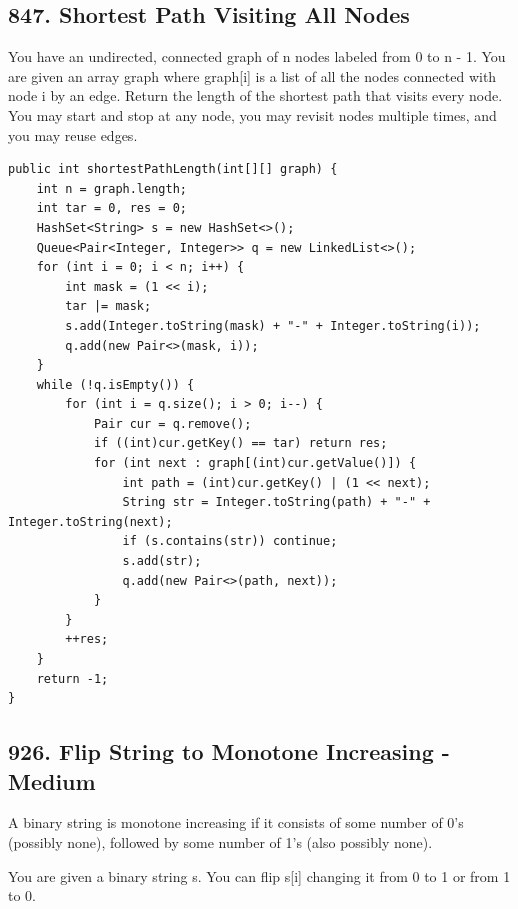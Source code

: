 \documentclass[9pt, b5paaper]{book}
\begin{document}
\subsection{847. Shortest Path Visiting All Nodes}
\label{sec-1-4-22}
You have an undirected, connected graph of n nodes labeled from 0 to n - 1. You are given an array graph where graph[i] is a list of all the nodes connected with node i by an edge.
Return the length of the shortest path that visits every node. You may start and stop at any node, you may revisit nodes multiple times, and you may reuse edges.
\begin{verbatim}
public int shortestPathLength(int[][] graph) {
    int n = graph.length;
    int tar = 0, res = 0;
    HashSet<String> s = new HashSet<>();
    Queue<Pair<Integer, Integer>> q = new LinkedList<>();
    for (int i = 0; i < n; i++) {
        int mask = (1 << i);
        tar |= mask;
        s.add(Integer.toString(mask) + "-" + Integer.toString(i));
        q.add(new Pair<>(mask, i));
    }
    while (!q.isEmpty()) {
        for (int i = q.size(); i > 0; i--) {
            Pair cur = q.remove();
            if ((int)cur.getKey() == tar) return res;
            for (int next : graph[(int)cur.getValue()]) {
                int path = (int)cur.getKey() | (1 << next);
                String str = Integer.toString(path) + "-" + Integer.toString(next);
                if (s.contains(str)) continue;
                s.add(str);
                q.add(new Pair<>(path, next));
            }
        }
        ++res;
    }
    return -1;
}
\end{verbatim}

\subsection{926. Flip String to Monotone Increasing - Medium}
\label{sec-1-4-23}
A binary string is monotone increasing if it consists of some number of 0's (possibly none), followed by some number of 1's (also possibly none).

You are given a binary string s. You can flip s[i] changing it from 0 to 1 or from 1 to 0.
\end{document}
